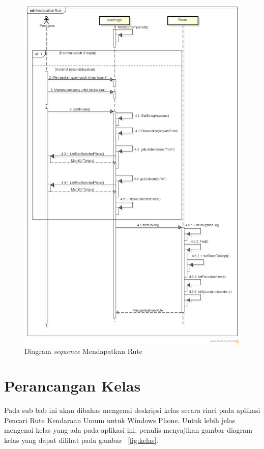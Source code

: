 \begin{figure}[h!]
	\centering
		\includegraphics[scale=0.5]{Gambar/sequence/MendapatkanRute}
	\caption{Diagram \textit{sequence} Mendapatkan Rute}
	\label{fig:sequence rute}
\end{figure}


\section{Perancangan Kelas}
\label{lab:Perancangan Kelas}
\hspace{0.5cm} Pada sub bab ini akan dibahas mengenai deskripsi kelas secara rinci pada aplikasi Pencari Rute Kendaraan Umum untuk Windows Phone. Untuk lebih jelas mengenai kelas yang ada pada aplikasi ini, penulis menyajikan gambar diagram kelas yang dapat dilihat pada  gambar ~\ref{fig:kelas}. 

